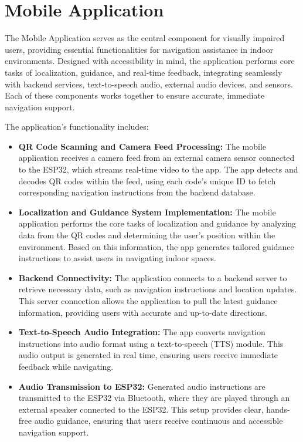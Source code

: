 \section{Mobile Application}

The Mobile Application serves as the central component for visually impaired users, providing essential functionalities for navigation assistance in indoor environments. Designed with accessibility in mind, the application performs core tasks of localization, guidance, and real-time feedback, integrating seamlessly with backend services, text-to-speech audio, external audio devices, and sensors. Each of these components works together to ensure accurate, immediate navigation support.

The application’s functionality includes:

\begin{itemize}
	\item \textbf{QR Code Scanning and Camera Feed Processing:} The mobile application receives a camera feed from an external camera sensor connected to the ESP32, which streams real-time video to the app. The app detects and decodes QR codes within the feed, using each code’s unique ID to fetch corresponding navigation instructions from the backend database.
	
	\item \textbf{Localization and Guidance System Implementation:} The mobile application performs the core tasks of localization and guidance by analyzing data from the QR codes and determining the user’s position within the environment. Based on this information, the app generates tailored guidance instructions to assist users in navigating indoor spaces.
	
	\item \textbf{Backend Connectivity:} The application connects to a backend server to retrieve necessary data, such as navigation instructions and location updates. This server connection allows the application to pull the latest guidance information, providing users with accurate and up-to-date directions.
	
	\item \textbf{Text-to-Speech Audio Integration:} The app converts navigation instructions into audio format using a text-to-speech (TTS) module. This audio output is generated in real time, ensuring users receive immediate feedback while navigating.
	
	\item \textbf{Audio Transmission to ESP32:} Generated audio instructions are transmitted to the ESP32 via Bluetooth, where they are played through an external speaker connected to the ESP32. This setup provides clear, hands-free audio guidance, ensuring that users receive continuous and accessible navigation support.
	

\end{itemize}
